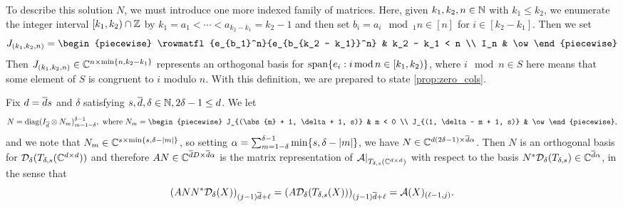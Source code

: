 To describe this solution $N$, we must introduce one more indexed family of matrices.  Here, given $k_1, k_2, n \in \mathbb{N}$ with $k_1 \le k_2$, we enumerate the integer interval $[k_1, k_2) \cap \mathbb{Z}$ by $k_1 = a_1 < \cdots < a_{k_2 - k_1} = k_2 - 1$ and then set $b_i = a_i \mod_1 n \in [n]$ for $i \in [k_2 - k_1]$.  Then we set \begin{equation} J_{(k_1, k_2, n)} = \begin{piecewise} \rowmatfl{e_{b_1}^n}{e_{b_{k_2 - k_1}}^n} & k_2 - k_1 < n \\ I_n & \ow \end{piecewise} \label{eq:circ_mod_mat} \end{equation}  Then $J_{(k_1, k_2, n)} \in \mathbb{C}^{n \times \min\{n, k_2 - k_1\}}$ represents an orthogonal basis for $\operatorname{span}\{e_i : i \operatorname{\mathbin{mod}} n \in [k_1, k_2)\}$, where $i \mod n \in S$ here means that some element of $S$ is congruent to $i$ modulo $n$.  With this definition, we are prepared to state \cref{prop:zero_cols}.
\begin{proposition} \label{prop:zero_cols}
  Fix $d = \overline{d} s$ and $\delta$ satisfying $s, \overline{d}, \delta \in \mathbb{N}, 2 \delta - 1 \le d$.  We let
  \begin{equation}
    N = \diag(I_{\dbar} \otimes N_m)_{m = 1 - \delta}^{\delta - 1},\ \text{where} \ 
    N_m = \begin{piecewise}
      J_{(\abs{m} + 1, \delta + 1, s)} & m < 0 \\
      J_{(1, \delta - m + 1, s)} & \ow
    \end{piecewise}
    , \label{eq:N_and_N_m}
  \end{equation}
  and we note that $N_m \in \mathbb{C}^{s \times \min\{s, \delta - \lvert m\rvert\}}$, so setting $\alpha = \sum_{m = 1 - \delta}^{\delta - 1} \min\{s, \delta - \lvert m\rvert\}$, we have $N \in \mathbb{C}^{d (2 \delta - 1) \times \overline{d} \alpha}$.  Then $N$ is an orthogonal basis for $\mathcal{D}_\delta(T_{\delta, s}(\mathbb{C}^{d \times d}))$ and therefore $A N \in \mathbb{C}^{\overline{d} D \times \overline{d} \alpha}$ is the matrix representation of $\left.\mathcal{A}\right|_{T_{\delta, s}(\mathbb{C}^{d \times d})}$ with respect to the basis $N^* \mathcal{D}_\delta(T_{\delta, s}) \in \mathbb{C}^{\overline{d} \alpha}$, in the sense that \[(A N N^* \mathcal{D}_\delta(X))_{(j - 1) \overline{d} + \ell} = (A \mathcal{D}_\delta(T_{\delta, s}(X)))_{(j - 1) \overline{d} + \ell} = \mathcal{A}(X)_{(\ell - 1, j)}.\]
\end{proposition}

